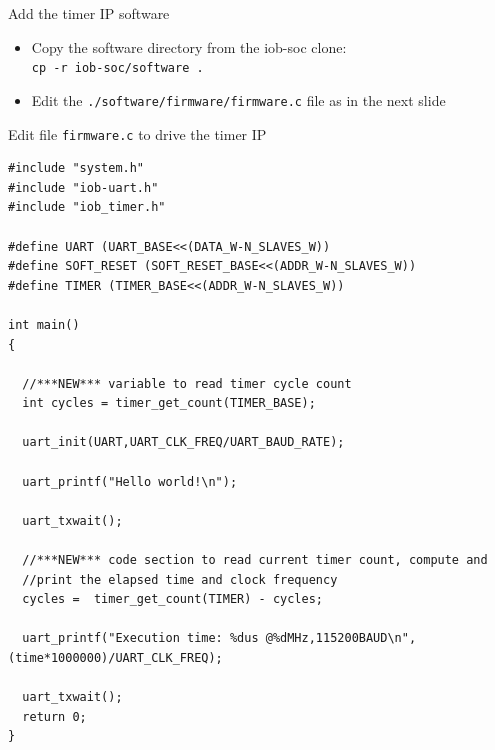 \documentclass [xcolor=svgnames, t] {beamer}
\begin{document}
\begin{frame}{Add the timer IP software}
\begin{itemize}
\item Copy the software directory from the iob-soc clone:
  \\{\tt cp -r iob-soc/software .}
\item Edit the {\tt ./software/firmware/firmware.c} file as in the next slide\\
\end{itemize}
\end{frame}

\begin{frame}[fragile]{Edit file {\tt firmware.c} to drive the timer IP}
\begin{tiny}
\begin{lstlisting}
#include "system.h"
#include "iob-uart.h"
#include "iob_timer.h"

#define UART (UART_BASE<<(DATA_W-N_SLAVES_W))
#define SOFT_RESET (SOFT_RESET_BASE<<(ADDR_W-N_SLAVES_W))
#define TIMER (TIMER_BASE<<(ADDR_W-N_SLAVES_W))

int main()
{ 

  //***NEW*** variable to read timer cycle count
  int cycles = timer_get_count(TIMER_BASE);
  
  uart_init(UART,UART_CLK_FREQ/UART_BAUD_RATE);   

  uart_printf("Hello world!\n");

  uart_txwait();
  
  //***NEW*** code section to read current timer count, compute and  
  //print the elapsed time and clock frequency
  cycles =  timer_get_count(TIMER) - cycles;

  uart_printf("Execution time: %dus @%dMHz,115200BAUD\n",(time*1000000)/UART_CLK_FREQ);

  uart_txwait();
  return 0;
}
\end{lstlisting}
\end{tiny}
\end{frame}
\end{document}
